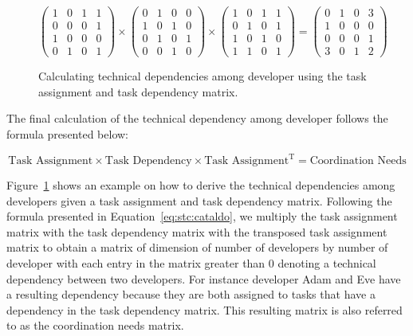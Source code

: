 \begin{figure}[ht]
\centering
\[
\left(
\begin{matrix}
1 & 0 & 1 & 1\\
0 & 0 & 0 & 1\\
1 & 0 & 0 & 0\\
0 & 1 & 0 & 1
\end{matrix}
\right)
\times
\left(
\begin{matrix}
0 & 1 & 0 & 0\\
1 & 0 & 1 & 0\\
0 & 1 & 0 & 1\\
0 & 0 & 1 & 0
\end{matrix}
\right)
\times
\left(
\begin{matrix}
1 & 0 & 1 & 1\\
0 & 1 & 0 & 1\\
1 & 0 & 1 & 0\\
1 & 1 & 0 & 1
\end{matrix}
\right)
=
\left(
\begin{matrix}
0 & 1 & 0 & 3\\
1 & 0 & 0 & 0\\
0 & 0 & 0 & 1\\
3 & 0 & 1 & 2
\end{matrix}
\right)
\]
\caption{Calculating technical dependencies among developer using the task assignment and task dependency matrix.}
\label{chap:3:fig:example:stc:cataldo}
\end{figure}
The final calculation of the technical dependency among developer follows the formula presented below:

\begin{equation}
\label{eq:stc:cataldo}
\text{Task Assignment} \times \text{Task Dependency} \times \text{Task Assignment}^{\text{T}} = \text{Coordination Needs}
\end{equation}

Figure~\ref{chap:3:fig:example:stc:cataldo} shows an example on how to derive the technical dependencies among developers given a task assignment and task dependency matrix.
Following the formula presented in Equation~\ref{eq:stc:cataldo}, we multiply the task assignment matrix with the task dependency matrix with the transposed task assignment matrix to obtain a matrix of dimension of number of developers by number of developer with each entry in the matrix greater than 0 denoting a technical dependency between two developers.
For instance developer Adam and Eve have a resulting dependency because they are both assigned to tasks that have a dependency in the task dependency matrix. 
This resulting matrix is also referred to as the coordination needs matrix.

